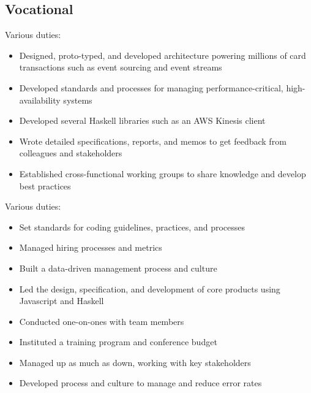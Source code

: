 \documentclass[11pt,a4paper,sans]{moderncv}   %
\begin{document}
\subsection{Vocational}
{Various duties:
  \begin{itemize}%
  \item Designed, proto-typed, and developed architecture powering
    millions of card transactions such as event sourcing and event
    streams
  \item Developed standards and processes for managing
    performance-critical, high-availability systems
  \item Developed several Haskell libraries such as an AWS Kinesis
    client
  \item Wrote detailed specifications, reports, and memos to get
    feedback from colleagues and stakeholders
  \item Established cross-functional working groups to share knowledge
    and develop best practices
\end{itemize}}
{Various duties:
  \begin{itemize}%
  \item Set standards for coding guidelines, practices, and processes
  \item Managed hiring processes and metrics
  \item Built a data-driven management process and culture
  \item Led the design, specification, and development of core
    products using Javascript and Haskell
  \item Conducted one-on-ones with team members
  \item Instituted a training program and conference budget
  \item Managed up as much as down, working with key stakeholders
  \item Developed process and culture to manage and reduce error rates
\end{itemize}}
\end{document}
